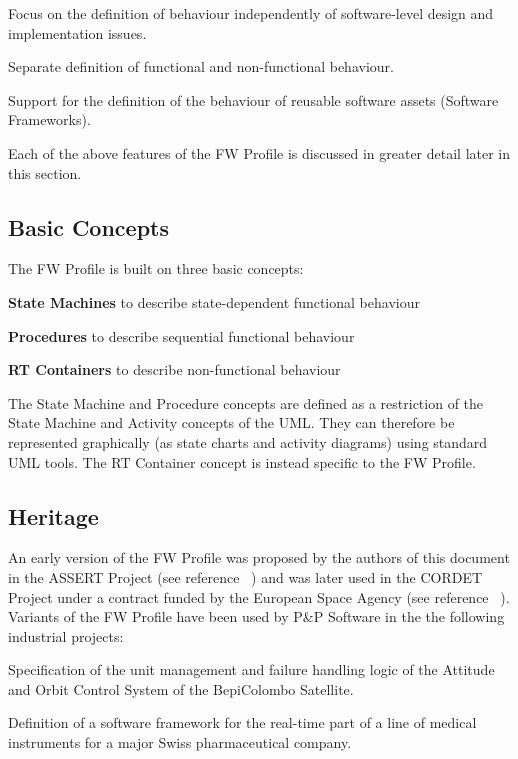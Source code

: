 \documentclass[a4paper,10pt]{article}
\newenvironment{fw_itemize}						%
{\begin{itemize}
  \setlength{\itemsep}{1mm}
  \setlength{\parskip}{0pt}
  \setlength{\parsep}{0pt}}
{\end{itemize}}
\newenvironment{fw_enumerate}					%
{\begin{enumerate}
  \setlength{\itemsep}{1mm}
  \setlength{\parskip}{0pt}
  \setlength{\parsep}{0pt}}
{\end{enumerate}}
\begin{document}
\begin{fw_enumerate}
\item Focus on the definition of behaviour independently of software-level design and
implementation issues.
\item Separate definition of functional and non-functional behaviour.
\item Support for the definition of the behaviour of reusable software assets (Software
Frameworks).
\end{fw_enumerate}

Each of the above features of the FW Profile is discussed in greater detail later in this section.

\subsection{Basic Concepts}\label{sec:basicConcepts} 
The FW Profile is built on three basic concepts:

\begin{fw_enumerate}
\item \textbf{State Machines} to describe state-dependent functional behaviour
\item \textbf{Procedures} to describe sequential functional behaviour
\item \textbf{RT Containers} to describe non-functional behaviour
\end{fw_enumerate}

The State Machine and Procedure concepts are defined as a restriction of the State Machine
and Activity concepts of the UML. They can therefore be represented graphically (as state charts and activity diagrams) using standard UML tools. The RT Container concept is instead specific to the FW Profile.

\subsection{Heritage}
An early version of the FW Profile was proposed by the authors of this document in the
ASSERT Project (see reference ~\cite{ref:rd-1}) and was later used in the CORDET Project under a contract funded by the European Space Agency (see reference ~\cite{ref:rd-2}). Variants of the FW Profile have been used by P\&P Software in the the following industrial projects:

\begin{fw_itemize} 
\item Specification of the unit management and failure handling logic of the Attitude and Orbit Control System of the BepiColombo Satellite.
\item Definition of a software framework for the real-time part of a line of medical instruments for a major Swiss pharmaceutical company.
\end{fw_itemize}
\end{document}
